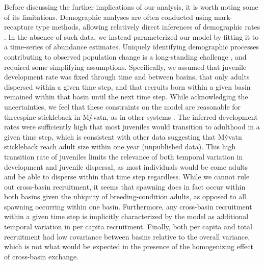 Before discussing the further implications of our analysis, 
it is worth noting some of its limitations. 
Demographic analyses are often conducted using mark-recapture type methods,
allowing relatively direct inferences of demographic rates
\citep{lebreton1992, fujiwara2002}.
In the absence of such data, 
we instead parameterized our model by fitting it to a time-series of abundance estimates.
Uniquely identifying demographic processes 
contributing to observed population change is a long-standing challenge 
\citep{wood1994, twombly1994},
and required some simplifying assumptions.
Specifically, 
we assumed that juvenile development rate was fixed through time and between basins,
that only adults dispersed within a given time step,
and that recruits born within a given basin remained within that basin until the next time step.
While acknowledging the uncertainties,
we feel that these constraints on the model are reasonable for 
threespine stickleback in M\'{y}vatn,
as in other systems \citep{yurtseva2019}.
The inferred development rates were sufficiently high that most juveniles would transition 
to adulthood in a given time step,
which is consistent with other data suggesting that M\'{y}vatn stickleback
reach adult size within one year (unpublished data).
This high transition rate of juveniles
limits the relevance of both temporal variation in development and juvenile dispersal,
as most individuals would be come adults and be able to disperse within that time step 
regardless.
While we cannot rule out cross-basin recruitment, 
it seems that spawning does in fact occur within both basins given the ubiquity 
of breeding-condition adults, 
as opposed to all spawning occurring within one basin.
Furthermore, any cross-basin recruitment within a given time step 
is implicitly characterized by the model as additional temporal variation in
per capita recruitment.
Finally, both per capita and total recruitment had low covariance between basins relative
to the overall variance, which is not what would be expected in the presence of 
the homogenizing effect of cross-basin exchange. 

